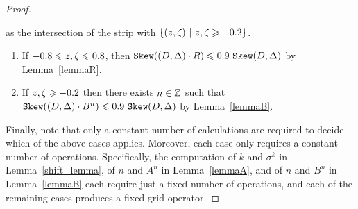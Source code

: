 \begin{proof}
\begin{description}
  as the intersection of the strip with 
  $\s{(z,\zeta)~|~z,\zeta\geq \formula{-\b}}$.
  \begin{enumerate}
    \item If $\formula{-\r}\leq z,\zeta\leq\formula{\r}$, 
    then $\sk(\state\cdot R)\leq \formula{\Qstep}~\sk\state$ by 
    Lemma~\ref{lemmaR}.
    \item If $z,\zeta\geq \formula{-\b}$ then there exists 
    $n\in\mathbb{Z}$ such that $\sk(\state\cdot B^n)\leq 
    \formula{\Qstep}~\sk\state$ by Lemma~\ref{lemmaB}.
  \end{enumerate}
\end{description}
Finally, note that only a constant number of calculations are required
to decide which of the above cases applies. Moreover, each case only
requires a constant number of operations. Specifically, the
computation of $k$ and $\sigma^k$ in Lemma~\ref{shift_lemma}, of $n$
and $A^n$ in Lemma~\ref{lemmaA}, and of $n$ and $B^n$ in
Lemma~\ref{lemmaB} each require just a fixed number of operations, and
each of the remaining cases produces a fixed grid operator.
\end{proof}

